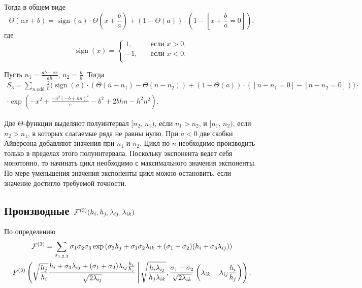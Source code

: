 \documentclass[12pt]{article}
\def\FW{F^{(3)}}
\def\cFW{{\cal F}^{(3)}}
\begin{document}
Тогда в общем виде 
\begin{equation}
    \Theta(ax+b) = \operatorname{sign}(a)\cdot\Theta\left(x+\frac{b}{a}\right) + (1-\Theta(a))\cdot\left(1-\left[x+\frac{b}{a} = 0\right]\right),
\end{equation}
где
\begin{equation}
    \operatorname{sign}(x) = 
    \begin{cases}
        1, \quad &\text{если $x > 0$}, \\
        -1, \quad &\text{если $x < 0$}. \\
    \end{cases}
\end{equation}

Пусть $n_1 = \frac{ab - cx}{ah}$, $n_2 =  \frac{b}{h}$. Тогда
\begin{multline}
    S_3 = \sum\limits_{n \; \text{odd}} \frac{2}{n} \Bigg(\operatorname{sign}(a)\cdot\left(\Theta\left(n-n_1\right) - \Theta\left(n - n_2\right)\right) +  (1-\Theta(a))\cdot \left([n-n_1 = 0] - [n - n_2 = 0]\right) \Bigg)\cdot\\\cdot\exp\left(- x^{2} + \frac{- a^{2} \left(- b + h n\right)^{2}}{c} - b^{2} + 2 b h n - h^{2} n^{2}\right).
\end{multline}

Две $\Theta$-функции выделяют полуинтервал $[n_2,\, n_1)$, если $n_1 > n_2$, и $[n_1,\, n_2)$, если $n_2 > n_1$, в которых слагаемые ряда не равны нулю. При  $a < 0$ две скобки Айверсона добавляют значения при $n_1$ и $n_2$. Цикл по $n$ необходимо производить только в пределах этого полуинтервала. Поскольку экспонента ведет себя монотонно, то начинать цикл необходимо с максимального значения экспоненты. По мере уменьшения значения экспоненты цикл можно остановить, если значение достигло требуемой точности. 

\subsection*{Производные $\cFW(h_i, h_j, \lambda_{ij}, \lambda_{ik})$}
По определению
\begin{multline}
    \cFW = \sum\limits_{\sigma_{1,2,3}}\sigma_1\sigma_2\sigma_3 \exp\left(\sigma_3h_j+\sigma_1\sigma_2\lambda_{ik}+(\sigma_1+\sigma_2)(h_i + \sigma_3\lambda_{ij})\right)
    \\
    \FW\left(\sqrt{\frac{h_j}{h_i}}\frac{h_i + \sigma_3\lambda_{ij} + (\sigma_1+\sigma_2)\lambda_{ij}\frac{h_i}{h_j}}{\sqrt{2\lambda_{ij}}} \, \Bigg| \, \sqrt{\frac{h_i\lambda_{ij}}{h_j\lambda_{ik}}}, \frac{\sigma_1+\sigma_2}{\sqrt{2\lambda_{ik}}}\left(\lambda_{ik}-\lambda_{ij}\frac{h_i}{h_j}\right) \right).
\end{multline}
\end{document}
